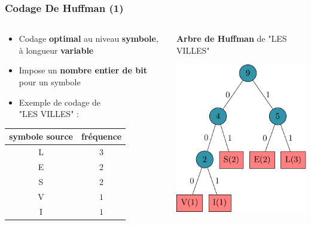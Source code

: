 \documentclass[aspectratio=43]{beamer}
\begin{document}
\begin{frame}
    \frametitle{Codage De Huffman (1)}

    \begin{columns}
        \begin{column}{0.5\textwidth}
            \centering

            \begin{itemize}
                \item Codage \textbf{optimal} au niveau \textbf{symbole}, à longueur \textbf{variable}
                \item Impose un \textbf{nombre entier de bit} pour un symbole
                \item Exemple de codage de \\ "LES VILLES" :
            \end{itemize}

            \vspace*{2em}

            \begin{tabular}{c | c}
                symbole source & fréquence \\
                \hline
                L & $3$ \\
                E & $2$ \\
                S & $2$ \\
                V & $1$ \\
                I & $1$ \\ \hline
            \end{tabular}
        \end{column}

        \begin{column}{0.5\textwidth}
            \textbf{Arbre de Huffman} de "LES VILLES"

            \vspace*{2em}

            \includegraphics{img/huffmanExample/huffmanExample.pdf}
        \end{column}
    \end{columns}
\end{frame}
\end{document}
